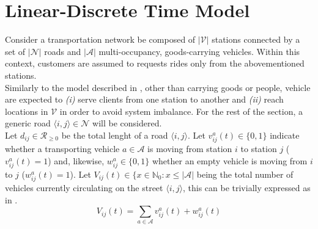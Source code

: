 \section{Linear-Discrete Time Model}\label{sec:linear_discrete_time_model}
Consider a transportation network be composed of $|\mathcal{V}|$ stations connected by a set of $|\mathcal{N}|$ roads and $|\mathcal{A}|$ multi-occupancy, goods-carrying vehicles. Within this context, customers are assumed to requests rides only from the abovementioned stations.\\ %
Similarly to the model described in , other than carrying goods or people, vehicle are expected to \textit{(i)} serve clients from one station to another and \textit{(ii)} reach locations in $\mathcal{V}$ in order to avoid system imbalance. For the rest of the section, a generic road $\langle i,j\rangle \in \mathcal{N}$ will be considered.\\
Let $d_{ij} \in \mathcal{R}_{\ge0}$ be the total lenght of a road $\langle i,j\rangle$. Let $v^a_{ij}(t) \in \{0,1\}$ indicate whether a transporting vehicle $a \in \mathcal{A}$ is moving from station $i$ to station $j$ ($v^a_{ij}(t) = 1$) and, likewise, $w^{a}_{ij}\in \{0,1\} $ whether an empty vehicle is moving from $i$ to $j$ ($w^{a}_{ij}(t)= 1$). Let $V_{ij}(t) \in \{ x \in \mathbb{N}_0 : x \leq |\mathcal{A}|$ being the total number of vehicles currently circulating on the street $\langle i,j\rangle$, this can be trivially expressed as in . \\

\begin{equation}
	V_{ij}(t) = \sum_{a \in \mathcal{A}} v^{a}_{ij}(t) +w^{a}_{ij}(t)
	\label{eq:vehicles_on_street}
\end{equation}

